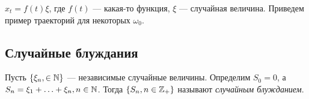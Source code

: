 \begin{example}
  $x_t = f(t) \xi$, где $f(t)$ --- какая-то функция, $\xi$ --- случайная величина.
  Приведем пример траекторий для некоторых $\omega_0$.
  \begin{center}
  \end{center}
\end{example}

\subsection{Случайные блуждания}

\begin{definition}
  Пусть $\{\xi_n, \in \mathbb{N}\}$ --- независимые случайные величины. Определим
  $S_0 = 0$, а $S_n = \xi_1 + \ldots + \xi_n, n \in \mathbb{N}$. Тогда $\{S_n, n \in \mathbb{Z}_{+}\}$
  называют \emph{случайным блужданием}.   
\end{definition}

